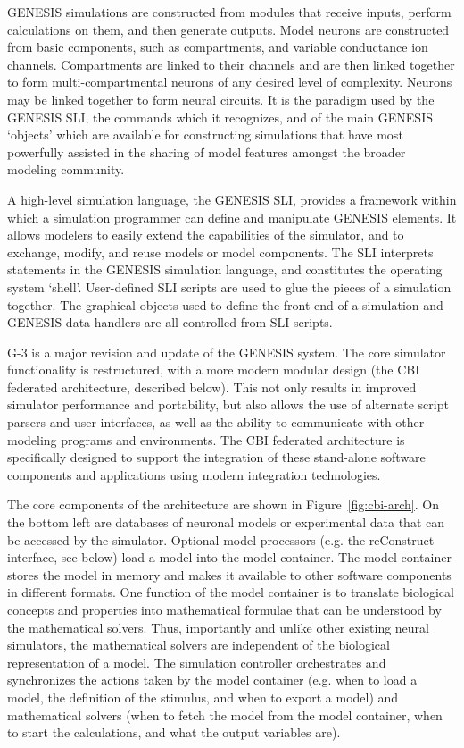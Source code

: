 \documentclass[12pt]{article}
\begin{document}
GENESIS simulations are constructed from modules that receive inputs,
perform calculations on them, and then generate outputs. Model neurons
are constructed from basic components, such as compartments, and
variable conductance ion channels. Compartments are linked to their
channels and are then linked together to form multi-compartmental
neurons of any desired level of complexity. Neurons may be linked
together to form neural circuits.  It is the paradigm used by the
GENESIS SLI, the commands which it recognizes, and of the main GENESIS
`objects' which are available for constructing simulations that have
most powerfully assisted in the sharing of model features amongst the
broader modeling community.

A high-level simulation language, the GENESIS SLI, provides a
framework within which a simulation programmer can define and
manipulate GENESIS elements. It allows modelers to easily extend the
capabilities of the simulator, and to exchange, modify, and reuse
models or model components. The SLI interprets statements in the
GENESIS simulation language, and constitutes the operating system
`shell'. User-defined SLI scripts are used to glue the pieces of a
simulation together. The graphical objects used to define the front
end of a simulation and GENESIS data handlers are all controlled from
SLI scripts.

G-3 is a major revision and update of the GENESIS system.  The core
simulator functionality is restructured, with a more modern modular
design (the CBI federated architecture, described below). This not
only results in improved simulator performance and portability, but
also allows the use of alternate script parsers and user interfaces,
as well as the ability to communicate with other modeling programs and
environments. The CBI federated architecture is specifically designed
to support the integration of these stand-alone software components
and applications using modern integration technologies.

The core components of the architecture are shown in
Figure~\ref{fig:cbi-arch}. On the bottom left are databases of
neuronal models or experimental data that can be accessed by the
simulator. Optional model processors (e.g. the reConstruct interface,
see below) load a model into the model container.  The model container
stores the model in memory and makes it available to other software
components in different formats.  One function of the model container
is to translate biological concepts and properties into mathematical
formulae that can be understood by the mathematical solvers. Thus,
importantly and unlike other existing neural simulators, the
mathematical solvers are independent of the biological representation
of a model. The simulation controller orchestrates and synchronizes
the actions taken by the model container (e.g. when to load a model,
the definition of the stimulus, and when to export a model) and
mathematical solvers (when to fetch the model from the model
container, when to start the calculations, and what the output
variables are).
\end{document}
